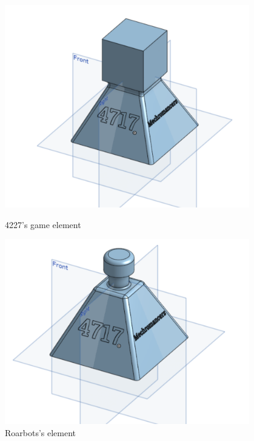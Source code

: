 \begin{figure}[ht]
\centering
\begin{minipage}[b]{.48\textwidth}
  \centering
  \includegraphics[width=0.95\textwidth]{Meetings/January/01-17-22/4227 Element - Jensen Miller.PNG}
  \caption{4227's game element}
  \label{fig:011722_1}
\end{minipage}%
\hfill%
\begin{minipage}[b]{.48\textwidth}
  \centering
  \includegraphics[width=0.95\textwidth]{Meetings/January/01-17-22/Roarbots Element - Jensen Miller.PNG}
  \caption{Roarbots's element}
  \label{fig:011722_2}
\end{minipage}
\end{figure}

